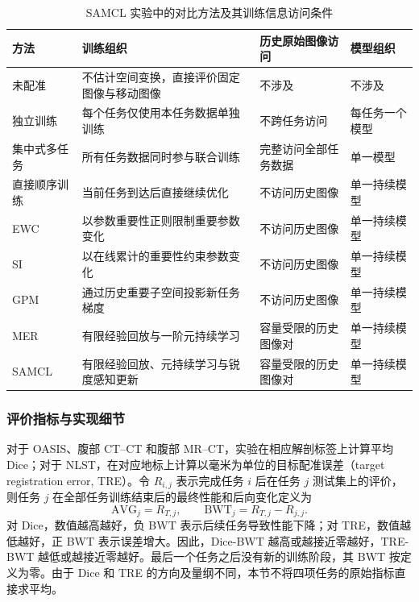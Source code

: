 \begin{table}[htbp]
\centering
\caption{SAMCL 实验中的对比方法及其训练信息访问条件}
\label{tab:samcl-baselines}
\thesistablefont
\renewcommand{\arraystretch}{1.16}
\setlength{\tabcolsep}{3pt}
\begin{tabular}{p{1.8cm}p{4.6cm}p{3.2cm}p{2.8cm}}
\toprule
方法 & 训练组织 & 历史原始图像访问 & 模型组织 \\
\midrule
未配准 & 不估计空间变换，直接评价固定图像与移动图像 & 不涉及 & 不涉及 \\
独立训练 & 每个任务仅使用本任务数据单独训练 & 不跨任务访问 & 每任务一个模型 \\
集中式多任务 & 所有任务数据同时参与联合训练 & 完整访问全部任务数据 & 单一模型 \\
直接顺序训练 & 当前任务到达后直接继续优化 & 不访问历史图像 & 单一持续模型 \\
EWC & 以参数重要性正则限制重要参数变化 & 不访问历史图像 & 单一持续模型 \\
SI & 以在线累计的重要性约束参数变化 & 不访问历史图像 & 单一持续模型 \\
GPM & 通过历史重要子空间投影新任务梯度 & 不访问历史图像 & 单一持续模型 \\
MER & 有限经验回放与一阶元持续学习 & 容量受限的历史图像对 & 单一持续模型 \\
SAMCL & 有限经验回放、元持续学习与锐度感知更新 & 容量受限的历史图像对 & 单一持续模型 \\
\bottomrule
\end{tabular}
\end{table}

\subsubsection{评价指标与实现细节}
\label{subsubsec:samcl-implementation}

对于 OASIS、腹部 CT--CT 和腹部 MR--CT，实验在相应解剖标签上计算平均 Dice；对于 NLST，在对应地标上计算以毫米为单位的目标配准误差（target registration error, TRE）。令 $R_{i,j}$ 表示完成任务 $i$ 后在任务 $j$ 测试集上的评价，则任务 $j$ 在全部任务训练结束后的最终性能和后向变化定义为
\begin{equation}
\mathrm{AVG}_j=R_{T,j},
\qquad
\mathrm{BWT}_j=R_{T,j}-R_{j,j}.
\label{eq:samcl-avg-bwt}
\end{equation}
对 Dice，数值越高越好，负 BWT 表示后续任务导致性能下降；对 TRE，数值越低越好，正 BWT 表示误差增大。因此，Dice-BWT 越高或越接近零越好，TRE-BWT 越低或越接近零越好。最后一个任务之后没有新的训练阶段，其 BWT 按定义为零。由于 Dice 和 TRE 的方向及量纲不同，本节不将四项任务的原始指标直接求平均。

